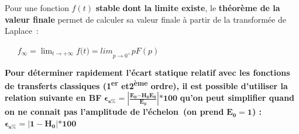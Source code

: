 Pour une fonction \(f(t)\) \textbf{stable} \textbf{dont la limite existe}, le \textbf{théorème de la valeur finale} permet de calculer sa valeur finale à partir de la transformée de Laplace~:

\(\ \ \ \ \ \ \ f_{\infty} = \lim_{t \rightarrow + \infty}f(t{) = lim}_{p \rightarrow 0^{+}}pF(p)\ \)

\textbf{Pour déterminer rapidement l'écart statique relatif avec les fonctions de transferts classiques (1\textsuperscript{er} et2\textsuperscript{ème} ordre), il est possible d'utiliser la relation suivante en BF} \(\mathbf{\epsilon}_{\mathbf{s\%}}\mathbf{=}\left| \frac{\mathbf{E}_{\mathbf{0}}\mathbf{-}\mathbf{H}_{\mathbf{0}}\mathbf{E}_{\mathbf{0}}}{\mathbf{E}_{\mathbf{0}}} \right|\mathbf{*100}\) \textbf{qu'on peut simplifier quand on ne connait pas l'amplitude de l'échelon~(on prend} \(\mathbf{E}_{\mathbf{0}}\mathbf{= 1}\)\textbf{) :} \(\mathbf{\epsilon}_{\mathbf{s\%}}\mathbf{=}\left| \mathbf{1 -}\mathbf{H}_{\mathbf{0}} \right|\mathbf{*100}\)



